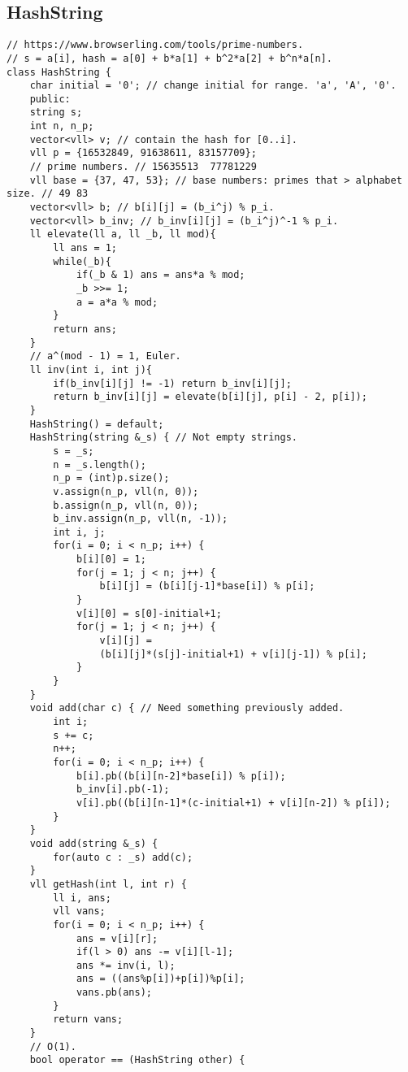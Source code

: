 \documentclass[a4paper]{article}
\begin{document}
\subsection*{HashString}
\begin{multicols}{2}
\begin{verbatim}
// https://www.browserling.com/tools/prime-numbers.
// s = a[i], hash = a[0] + b*a[1] + b^2*a[2] + b^n*a[n].
class HashString {
    char initial = '0'; // change initial for range. 'a', 'A', '0'.
    public:
    string s;
    int n, n_p;
    vector<vll> v; // contain the hash for [0..i].
    vll p = {16532849, 91638611, 83157709}; 
    // prime numbers. // 15635513  77781229
    vll base = {37, 47, 53}; // base numbers: primes that > alphabet size. // 49 83
    vector<vll> b; // b[i][j] = (b_i^j) % p_i.
    vector<vll> b_inv; // b_inv[i][j] = (b_i^j)^-1 % p_i. 
    ll elevate(ll a, ll _b, ll mod){
        ll ans = 1;
        while(_b){
            if(_b & 1) ans = ans*a % mod;
            _b >>= 1;
            a = a*a % mod;
        }
        return ans;
    }
    // a^(mod - 1) = 1, Euler.
    ll inv(int i, int j){
        if(b_inv[i][j] != -1) return b_inv[i][j];
        return b_inv[i][j] = elevate(b[i][j], p[i] - 2, p[i]);
    }
    HashString() = default;
    HashString(string &_s) { // Not empty strings.
        s = _s;
        n = _s.length();
        n_p = (int)p.size();
        v.assign(n_p, vll(n, 0));
        b.assign(n_p, vll(n, 0));
        b_inv.assign(n_p, vll(n, -1));
        int i, j;
        for(i = 0; i < n_p; i++) {
            b[i][0] = 1;
            for(j = 1; j < n; j++) {
                b[i][j] = (b[i][j-1]*base[i]) % p[i];
            }
            v[i][0] = s[0]-initial+1;
            for(j = 1; j < n; j++) {
                v[i][j] = 
                (b[i][j]*(s[j]-initial+1) + v[i][j-1]) % p[i];
            }
        }
    }
    void add(char c) { // Need something previously added.
        int i;
        s += c;
        n++;
        for(i = 0; i < n_p; i++) {
            b[i].pb((b[i][n-2]*base[i]) % p[i]);
            b_inv[i].pb(-1);
            v[i].pb((b[i][n-1]*(c-initial+1) + v[i][n-2]) % p[i]);
        }
    }
    void add(string &_s) {
        for(auto c : _s) add(c);
    }
    vll getHash(int l, int r) {
        ll i, ans;
        vll vans;
        for(i = 0; i < n_p; i++) {
            ans = v[i][r];
            if(l > 0) ans -= v[i][l-1];
            ans *= inv(i, l);
            ans = ((ans%p[i])+p[i])%p[i];
            vans.pb(ans);
        }
        return vans;
    }
    // O(1).
    bool operator == (HashString other) {

\end{verbatim}
\end{multicols}
\end{document}
